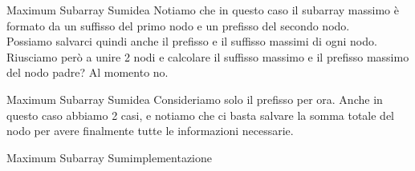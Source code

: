 \documentclass[compress]{beamer}
\begin{document}
\begin{frame}{Maximum Subarray Sum}{idea}
    Notiamo che in questo caso il subarray massimo è formato da un suffisso del primo nodo e un prefisso del secondo nodo.\\
    \pause
    Possiamo salvarci quindi anche il prefisso e il suffisso massimi di ogni nodo.\\
    \pause
    Riusciamo però a unire 2 nodi e calcolare il suffisso massimo e il prefisso massimo del nodo padre? Al momento no.
\end{frame}

\begin{frame}{Maximum Subarray Sum}{idea}
    Consideriamo solo il prefisso per ora.
    \vfill
    \vfill
    \pause
    Anche in questo caso abbiamo 2 casi, e notiamo che ci basta salvare la somma totale del nodo per avere finalmente tutte le informazioni necessarie.
\end{frame}

\begin{frame}{Maximum Subarray Sum}{implementazione}
    \vfill
    \vfill
\end{frame}
\end{document}
